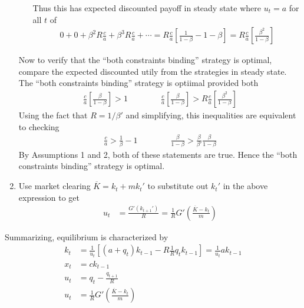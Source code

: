 \documentclass[12pt]{article}
\theoremstyle{plain}
\theoremstyle{definition}
\theoremstyle{remark}
\begin{document}
\begin{enumerate}
\begin{enumerate}[label=(\roman*)]
        Thus this has expected discounted payoff in steady state where
        $u_t=a$ for all $t$ of
        \begin{align*}
            0
            +
            0
            +
            \beta^2
            R\frac{c}{a}
            +
            \beta^3
            R
            \frac{c}{a}
            +
            \cdots
            =
            R
            \frac{c}{a}
            \left[
              \frac{1}{1-\beta}
              - 1 - \beta
            \right]
            =
            R
            \frac{c}{a}
            \left[
              \frac{\beta^2}{1-\beta}
            \right]
        \end{align*}

    \end{enumerate}
    Now to verify that the ``both constraints binding'' strategy is
    optimal, compare the expected discounted utily from the strategies
    in steady state.
    The ``both constraints binding'' strategy is optiimal provided both
    \begin{align*}
        \frac{c}{a}
        \left[
          \frac{\beta}{1-\beta}
        \right]
        >
        1
        \qquad
        \qquad
        \frac{c}{a}
        \left[
          \frac{\beta}{1-\beta}
        \right]
        >
        R
        \frac{c}{a}
        \left[
          \frac{\beta^2}{1-\beta}
        \right]
    \end{align*}
    Using the fact that $R=1/\beta'$ and simplifying, this inequalities
    are equivalent to checking
    \begin{align*}
        \frac{c}{a}
        >
        \frac{1}{\beta}
        -1
        \qquad
        \qquad
        \frac{\beta}{1-\beta}
        >
        \frac{\beta}{\beta'}
        \frac{\beta}{1-\beta}
    \end{align*}
    By Assumptions 1 and 2, both of these statements are true. Hence the
    ``both constraints binding'' strategy is optimal.


  \item Use market clearing $\overline{K}=k_t + mk_t'$ to substitute
    out $k_t'$ in the above expression to get
    \begin{align*}
      u_t
      &=
      \frac{G'(k_{t+1}')}{R}
      =
      \frac{1}{R}
      G'\left(\frac{\overline{K}-k_t}{m}\right)
    \end{align*}

\end{enumerate}
Summarizing, equilibrium is characterized by
\begin{align*}
  k_t
  &=
  \frac{1}{u_t}
  [
  (a+q_t)k_{t-1}
  - R\frac{1}{R}q_tk_{t-1}
  ]
  =
  \frac{1}{u_t}
  ak_{t-1}
  \\
  x_t&= ck_{t-1}
  \\
  u_t &= q_t - \frac{q_{t+1}}{R}
  \\
  u_t
  &=
  \frac{1}{R}
  G'\left(\frac{\overline{K}-k_t}{m}\right)
\end{align*}
\end{document}
